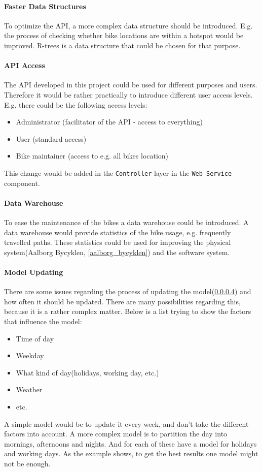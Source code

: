 \paragraph{Faster Data Structures}
To optimize the API, a more complex data structure should be introduced.
E.g. the process of checking whether bike locations are within a hotspot would be improved.
R-trees\cite[Section 25.3.5.3]{database_system_concepts} is a data structure that could be chosen for that purpose.

\paragraph{API Access}
The API developed in this project could be used for different purposes and users.
Therefore it would be rather practically to introduce different user access levels.
E.g. there could be the following access levels:
\begin{itemize}
\item Administrator (facilitator of the API - access to everything)
\item User (standard access)
\item Bike maintainer (access to e.g. all bikes location)
\end{itemize}
This change would be added in the \texttt{Controller} layer in the \texttt{Web Service} component.

\paragraph{Data Warehouse \cite{data_warehousing}}
To ease the maintenance of the bikes a data warehouse could be introduced.
A data warehouse would provide statistics of the bike usage, e.g. frequently travelled paths.
These statistics could be used for improving the physical system(Aalborg Bycyklen, \cref{aalborg_bycyklen}) and the software system.

\paragraph{Model Updating}
There are some issues regarding the process of updating the model(\cref{}) and how often it should be updated.
There are many possibilities regarding this, because it is a rather complex matter.
Below is a list trying to show the factors that influence the model:
\begin{itemize}
\item Time of day
\item Weekday
\item What kind of day(holidays, working day, etc.)
\item Weather
\item etc.
\end{itemize}
A simple model would be to update it every week, and don't take the different factors into account.
A more complex model is to partition the day into mornings, afternoons and nights.
And for each of these have a model for holidays and working days.
As the example shows, to get the best results one model might not be enough. 

